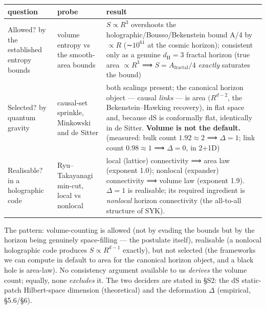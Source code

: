 \documentclass[11pt,a4paper]{article}
\begin{document}
\begin{longtable}[]{@{}
  >{\raggedright\arraybackslash}p{}
  >{\raggedright\arraybackslash}p{}
  >{\raggedright\arraybackslash}p{}@{}}
\toprule\noalign{}
\begin{minipage}[b]{\linewidth}\raggedright
question
\end{minipage} & \begin{minipage}[b]{\linewidth}\raggedright
probe
\end{minipage} & \begin{minipage}[b]{\linewidth}\raggedright
result
\end{minipage} \\
\midrule\noalign{}
\endhead
\bottomrule\noalign{}
\endlastfoot
Allowed? by the established entropy bounds & volume entropy vs the
smooth-area bounds & \(S \propto  R^{3}\) overshoots the
holographic/Bousso/Bekenstein bound A/4 by \(\propto  R\) (∼\(10^{61}\)
at the cosmic horizon); consistent only as a genuine
\(d_{\mathrm{H}}=3\) fractal horizon (true area \(\propto  R^{3}\) ⟹
\(S = A_{\mathrm{fractal}}/4\) \emph{exactly} saturates the bound) \\
Selected? by quantum gravity & causal-set sprinkle, Minkowski and de
Sitter & both scalings present; the canonical horizon object --- causal
\emph{links} --- is area \((R^{d-2}\), the Bekenstein--Hawking
recovery), in flat space and, because dS is conformally flat,
identically in de Sitter. \textbf{Volume is not the default.} (measured:
bulk count \(1.92\approx 2\) ⟹ \(\Delta =1\); link count
\(0.98\approx 1\) ⟹ \(\Delta =0\), in 2+1D) \\
Realisable? in a holographic code & Ryu--Takayanagi min-cut, local vs
nonlocal & local (lattice) connectivity ⟹ area law (exponent 1.0);
nonlocal (expander) connectivity ⟹ volume law (exponent 1.9).
\(\Delta =1\) is realisable; its required ingredient is \emph{nonlocal}
horizon connectivity (the all-to-all structure of SYK). \\
\end{longtable}

The pattern: volume-counting is allowed (not by evading the bounds but
by the horizon being genuinely space-filling --- the postulate itself),
realisable (a nonlocal holographic code produces \(S \propto  R^{d-1}\)
exactly), but not selected (the frameworks we can compute in default to
area for the canonical horizon object, and a black hole is area-law). No
consistency argument available to us \emph{derives} the volume count;
equally, none \emph{excludes} it. The two deciders are stated in §S2:
the dS static-patch Hilbert-space dimension (theoretical) and the
deformation \(\Delta\) (empirical, §5.6/§6).
\end{document}
